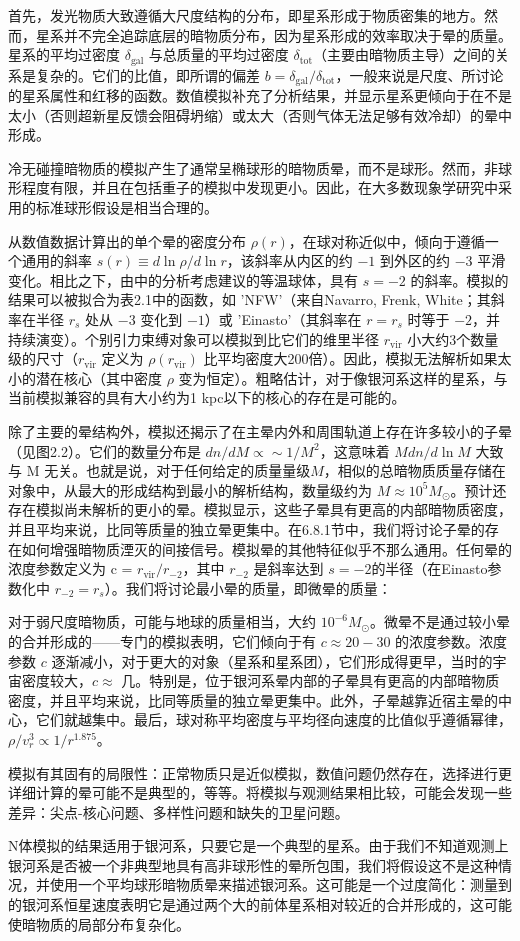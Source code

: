 首先，发光物质大致遵循大尺度结构的分布，即星系形成于物质密集的地方。然而，星系并不完全追踪底层的暗物质分布，因为星系形成的效率取决于晕的质量。星系的平均过密度 \( \delta_{\text{gal}} \) 与总质量的平均过密度 \( \delta_{\text{tot}} \)（主要由暗物质主导）之间的关系是复杂的。它们的比值，即所谓的偏差  \( b =\delta_{\text{gal}}/\delta_{\text{tot}} \)，一般来说是尺度、所讨论的星系属性和红移的函数。数值模拟补充了分析结果，并显示星系更倾向于在不是太小（否则超新星反馈会阻碍坍缩）或太大（否则气体无法足够有效冷却）的晕中形成。

冷无碰撞暗物质的模拟产生了通常呈椭球形的暗物质晕，而不是球形。然而，非球形程度有限，并且在包括重子的模拟中发现更小。因此，在大多数现象学研究中采用的标准球形假设是相当合理的。

从数值数据计算出的单个晕的密度分布 \( \rho(r) \)，在球对称近似中，倾向于遵循一个通用的斜率 \( s(r) \equiv d\ln\rho/d\ln r \)，该斜率从内区的约 $-1$ 到外区的约 $-3$ 平滑变化。相比之下，由中的分析考虑建议的等温球体，具有 $s = -2$ 的斜率。模拟的结果可以被拟合为表2.1中的函数，如 'NFW'（来自Navarro, Frenk, White；其斜率在半径 $r_s$ 处从 $-3$ 变化到 $-1$）或 'Einasto'（其斜率在 $r = r_s$ 时等于 $-2$，并持续演变）。个别引力束缚对象可以模拟到比它们的维里半径 \( r_{\text{vir}} \) 小大约3个数量级的尺寸（\( r_{\text{vir}} \) 定义为 \( \rho(r_{\text{vir}}) \) 比平均密度大200倍）。因此，模拟无法解析如果太小的潜在核心（其中密度 \( \rho \) 变为恒定）。粗略估计，对于像银河系这样的星系，与当前模拟兼容的具有大小约为1 kpc以下的核心的存在是可能的。

除了主要的晕结构外，模拟还揭示了在主晕内外和周围轨道上存在许多较小的子晕（见图2.2）。它们的数量分布是 \( dn/dM \propto \sim 1/M^2 \)，这意味着 \( M dn/d\ln M \) 大致与 M 无关。也就是说，对于任何给定的质量量级$ M$，相似的总暗物质质量存储在对象中，从最大的形成结构到最小的解析结构，数量级约为 \( M \approx 10^5 M_\odot \)。预计还存在模拟尚未解析的更小的晕。模拟显示，这些子晕具有更高的内部暗物质密度，并且平均来说，比同等质量的独立晕更集中。在6.8.1节中，我们将讨论子晕的存在如何增强暗物质湮灭的间接信号。模拟晕的其他特征似乎不那么通用。任何晕的浓度参数定义为 c = \( r_{\text{vir}}/r_{-2} \)，其中 \( r_{-2} \) 是斜率达到 $s = -2 $的半径（在Einasto参数化中 \( r_{-2} = r_s \)）。我们将讨论最小晕的质量，即微晕的质量：

对于弱尺度暗物质，可能与地球的质量相当，大约 \(10^{-6} M_\odot\)。微晕不是通过较小晕的合并形成的——专门的模拟表明，它们倾向于有 \(c \approx 20 - 30\) 的浓度参数。浓度参数 \(c\) 逐渐减小，对于更大的对象（星系和星系团），它们形成得更早，当时的宇宙密度较大，\(c \approx\) 几。特别是，位于银河系晕内部的子晕具有更高的内部暗物质密度，并且平均来说，比同等质量的独立晕更集中。此外，子晕越靠近宿主晕的中心，它们就越集中。最后，球对称平均密度与平均径向速度的比值似乎遵循幂律，\(\rho/v^3_r \propto 1/r^{1.875}\)。

模拟有其固有的局限性：正常物质只是近似模拟，数值问题仍然存在，选择进行更详细计算的晕可能不是典型的，等等。将模拟与观测结果相比较，可能会发现一些差异：尖点-核心问题、多样性问题和缺失的卫星问题。

N体模拟的结果适用于银河系，只要它是一个典型的星系。由于我们不知道观测上银河系是否被一个非典型地具有高非球形性的晕所包围，我们将假设这不是这种情况，并使用一个平均球形暗物质晕来描述银河系。这可能是一个过度简化：测量到的银河系恒星速度表明它是通过两个大的前体星系相对较近的合并形成的，这可能使暗物质的局部分布复杂化。





 



